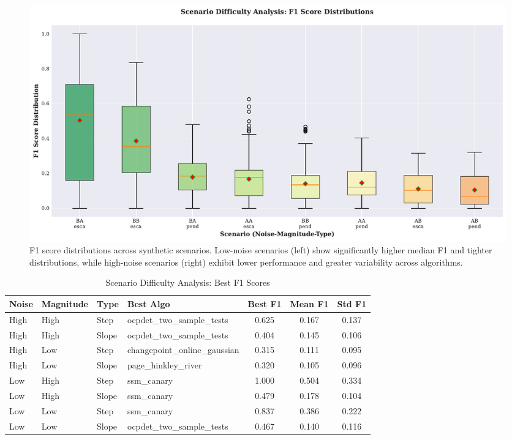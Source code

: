 \begin{figure}[H]
\centering
\includegraphics[width=\textwidth]{figures/fig_scenario_difficulty.pdf}
\caption{F1 score distributions across synthetic scenarios. Low-noise scenarios (left) show significantly higher median F1 and tighter distributions, while high-noise scenarios (right) exhibit lower performance and greater variability across algorithms.}
\label{fig:scenario_difficulty}
\end{figure}

\begin{table}[H]
\centering
\caption{Scenario Difficulty Analysis: Best F1 Scores}
\label{tab:scenario_matrix}
\small
\begin{tabular}{llllccc}
\toprule
\textbf{Noise} & \textbf{Magnitude} & \textbf{Type} & \textbf{Best Algo} & \textbf{Best F1} & \textbf{Mean F1} & \textbf{Std F1} \\
\midrule
High & High & Step & ocpdet\_two\_sample\_tests & 0.625 & 0.167 & 0.137 \\
High & High & Slope & ocpdet\_two\_sample\_tests & 0.404 & 0.145 & 0.106 \\
High & Low & Step & changepoint\_online\_gaussian & 0.315 & 0.111 & 0.095 \\
High & Low & Slope & page\_hinkley\_river & 0.320 & 0.105 & 0.096 \\
Low & High & Step & ssm\_canary & 1.000 & 0.504 & 0.334 \\
Low & High & Slope & ssm\_canary & 0.479 & 0.178 & 0.104 \\
Low & Low & Step & ssm\_canary & 0.837 & 0.386 & 0.222 \\
Low & Low & Slope & ocpdet\_two\_sample\_tests & 0.467 & 0.140 & 0.116 \\
\bottomrule
\end{tabular}
\end{table}

